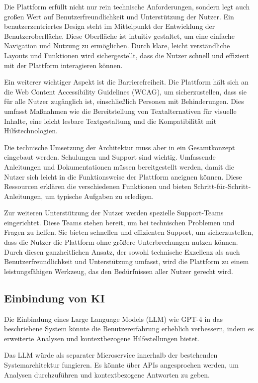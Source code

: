 \documentclass[conference]{IEEEtran}
\begin{document}
Die Plattform erfüllt nicht nur rein technische Anforderungen, sondern legt auch großen Wert auf Benutzerfreundlichkeit und Unterstützung der Nutzer. Ein benutzerzentriertes Design steht im Mittelpunkt der Entwicklung der Benutzeroberfläche. Diese Oberfläche ist intuitiv gestaltet, um eine einfache Navigation und Nutzung zu ermöglichen. Durch klare, leicht verständliche Layouts und Funktionen wird sichergestellt, dass die Nutzer schnell und effizient mit der Plattform interagieren können.

Ein weiterer wichtiger Aspekt ist die Barrierefreiheit. Die Plattform hält sich an die Web Content Accessibility Guidelines (WCAG), um sicherzustellen, dass sie für alle Nutzer zugänglich ist, einschließlich Personen mit Behinderungen. Dies umfasst Maßnahmen wie die Bereitstellung von Textalternativen für visuelle Inhalte, eine leicht lesbare Textgestaltung und die Kompatibilität mit Hilfstechnologien.

Die technische Umsetzung der Architektur muss aber in ein Gesamtkonzept eingebaut werden. Schulungen und Support sind wichtig. Umfassende Anleitungen und Dokumentationen müssen bereitgestellt werden, damit die Nutzer sich leicht in die Funktionsweise der Plattform aneignen können. Diese Ressourcen erklären die verschiedenen Funktionen und bieten Schritt-für-Schritt-Anleitungen, um typische Aufgaben zu erledigen.

Zur weiteren Unterstützung der Nutzer werden spezielle Support-Teams eingerichtet. Diese Teams stehen bereit, um bei technischen Problemen und Fragen zu helfen. Sie bieten schnellen und effizienten Support, um sicherzustellen, dass die Nutzer die Plattform ohne größere Unterbrechungen nutzen können. Durch diesen ganzheitlichen Ansatz, der sowohl technische Exzellenz als auch Benutzerfreundlichkeit und Unterstützung umfasst, wird die Plattform zu einem leistungsfähigen Werkzeug, das den Bedürfnissen aller Nutzer gerecht wird.

\subsection{Einbindung von KI}
Die Einbindung eines Large Language Models (LLM) wie GPT-4 in das beschriebene System könnte die Benutzererfahrung erheblich verbessern, indem es erweiterte Analysen und kontextbezogene Hilfestellungen bietet.


Das LLM würde als separater Microservice innerhalb der bestehenden Systemarchitektur fungieren. Es könnte über APIs angesprochen werden, um Analysen durchzuführen und kontextbezogene Antworten zu geben.
\end{document}
